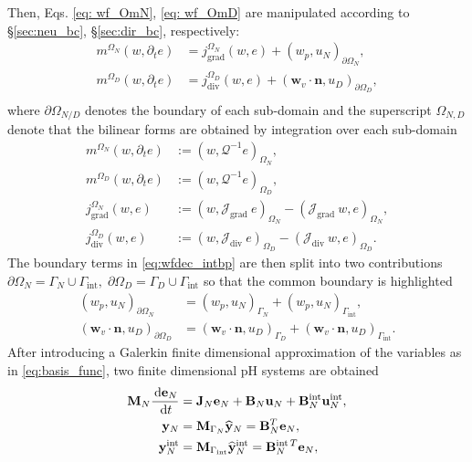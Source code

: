 \documentclass{ifacconf}
\newcommand{\secref}[1]{\S\ref{#1}}
\begin{document}
Then, Eqs. \eqref{eq: wf_OmN}, \eqref{eq: wf_OmD} are manipulated according to \secref{sec:neu_bc}, \secref{sec:dir_bc}, respectively:
\begin{equation}
\label{eq:wfdec_intbp}
\begin{aligned}
m^{\Omega_N}(w, \partial_t{e}) &= j_{\text{grad}}^{\Omega_N}(w, e) + \left(w_p, u_N \right)_{\partial \Omega_N}, \\
m^{\Omega_D}(w, \partial_t{e}) &= j_{\text{div}}^{\Omega_D}(w, e) + \left(\bm{w}_v \cdot \bm{n}, u_D \right)_{\partial \Omega_D}, \\
\end{aligned}
\end{equation}
where $\partial \Omega_{N/D}$ denotes the boundary of each sub-domain and the superscript ${\Omega_{N,D}}$ denote that the bilinear forms are obtained by integration over each sub-domain
\begin{align*}
m^{\Omega_N}(w, \partial_t{e}) &:= \left(w, \mathcal{Q}^{-1} e \right)_{\Omega_{N}}, \\
m^{\Omega_D}(w, \partial_t{e}) &:= \left(w, \mathcal{Q}^{-1} e \right)_{\Omega_{D}},  \\
j_{\text{grad}}^{\Omega_{N}}(w, e) &:= \left(w, \mathcal{J}_{\text{grad}} \ e \right)_{\Omega_{N}} - \left(\mathcal{J}_{\text{grad}} \ w, e \right)_{\Omega_{N}}, \\
j_{\text{div}}^{\Omega_{D}}(w, e) &:= \left(w, \mathcal{J}_{\text{div}} \ e \right)_{\Omega_{D}} - \left(\mathcal{J}_{\text{div}} \ w, e \right)_{\Omega_{D}}.
\end{align*}
The boundary terms in \eqref{eq:wfdec_intbp} are then split into two contributions $\partial\Omega_N = \Gamma_N \cup \Gamma_{\text{int}}, \; \partial\Omega_D = \Gamma_D \cup \Gamma_{\text{int}}$ so that the common boundary is highlighted
\begin{align*}
\left(w_p, u_N \right)_{\partial \Omega_N} &= \left(w_p, u_N \right)_{\Gamma_N} + \left(w_p, u_N\right)_{\Gamma_{\text{int}}}, \\
\left(\bm{w}_v \cdot \bm{n}, u_D \right)_{\partial \Omega_D} &= \left(\bm{w}_v \cdot \bm{n}, u_D \right)_{\Gamma_D} + \left(\bm{w}_v \cdot \bm{n}, u_D \right)_{\Gamma_{\text{int}}}.
\end{align*}
After introducing  a Galerkin finite dimensional approximation of the variables as in \ref{eq:basis_func}, two finite dimensional pH systems are obtained
\begin{equation}
\label{eq:fd_N}
\begin{aligned}
\mathbf{M}_N \frac{\,\mathrm{d} \mathbf{e}_N}{\,\mathrm{d} t} &= \mathbf{J}_N \mathbf{e}_N  + \mathbf{B}_N \mathbf{u}_N + \mathbf{B}_{N}^{\text{int}} \mathbf{u}_N^{\text{int}}, \\
\mathbf{y}_N &= \mathbf{M}_{\Gamma_N} \widehat{\mathbf{y}}_N = \mathbf{B}_{N}^T \mathbf{e}_N, \\
\mathbf{y}_N^{\text{int}} &= \mathbf{M}_{\Gamma_{\text{int}}} \widehat{\mathbf{y}}_N^{\text{int}} =  \mathbf{B}_{N}^{\text{int}\, T} \mathbf{e}_N, \\
\end{aligned}
\end{equation}
\end{document}
